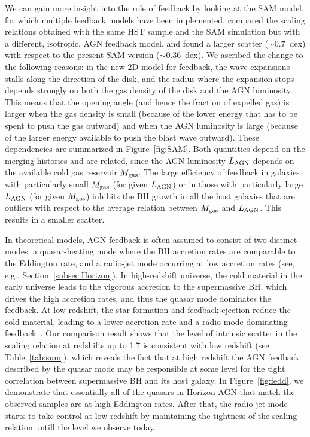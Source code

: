 \documentclass[twocolumn]{aastex631}
\begin{document}
We can gain more insight into the role of feedback by looking at the SAM model, for which multiple feedback models have been implemented. \citet{Ding2020b} compared the scaling relations obtained with the same HST sample and the SAM simulation but with a different, isotropic, AGN feedback model, and found a larger scatter ($\sim0.7$~dex) with respect to the present SAM version ($\sim0.36$~dex). We ascribed the change to the following reasons: in the new 2D model for feedback, the wave expansions stalls along the direction of the disk, and the radius where the expansion stops depends strongly on both the gas density of the disk and the AGN luminosity. 
This means that the opening angle (and hence the fraction of expelled gas) is larger when the gas density is small (because of the lower energy that has to be spent to push the gas outward) and when the AGN luminosity is large (because of the larger energy available to push the blast wave outward). These dependencies are summarized in Figure~\ref{fig:SAM}. 
Both quantities depend on the merging histories and are  related, since the AGN luminosity $L_{\rm AGN}$ depends on the available cold gas reservoir $M_{\rm gas}$.
The large efficiency of feedback in galaxies with particularly small $M_{\rm gas}$ (for given $L_{\rm AGN}$) or in those with particularly large $L_{\rm AGN}$
(for given $M_{\rm gas}$) inhibits the BH growth in all the host galaxies that are outliers with respect to the average relation between $M_{\rm gas}$ and $L_{\rm AGN}$. 
This results in a smaller scatter.

In theoretical models, AGN feedback is often assumed to consist of two distinct modes:
a quasar-heating mode where the BH accretion rates are comparable to the Eddington rate, and a radio-jet mode occurring at low accretion rates (see, e.g., Section~\ref{subsec:Horizon}). In high-redshift universe, the cold material in the early universe leads to the vigorous accretion to the supermassive BH, which drives the high accretion rates, and thus the quasar mode dominates the feedback. At low redshift, the star formation and feedback ejection reduce the cold material, leading to a lower accretion rate and a radio-mode-dominating feedback~\citep[e.g.][]{2012MNRAS.420.2662D,2016MNRAS.460.2979V,2018MNRAS.479.4056W}. Our comparison result shows that the level of intrinsic scatter in the scaling relation at redshifts up to 1.7 is consistent with low redshift (see Table~\ref{tab:sum}), which reveals the fact that at high redshift the AGN feedback described by the quasar mode may be responsible at some level for the tight correlation between supermassive BH and its host galaxy. In Figure~\ref{fig:fedd}, we demonstrate that essentially all of the quasars in Horizon-AGN that match the observed samples are at high Eddington rates. After that, the radio-jet mode starts to take control at low redshift by maintaining the tightness of the scaling relation untill the level we observe today.
\end{document}
